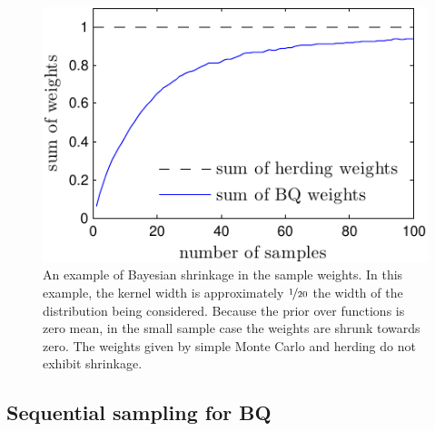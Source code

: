 \begin{figure}
	\centering
	\includegraphics[width=\columnwidth]{figs/herding/weights_shrinkage}
	
		\caption[The concept of shrinkage in Bayesian quadrature]{An example of Bayesian shrinkage in the sample weights.  In this example, the kernel width is approximately $\nicefrac{1}{20}$ the width of the distribution being considered.  Because the prior over functions is zero mean, in the small sample case the weights are shrunk towards zero.  The weights given by simple Monte Carlo and herding do not exhibit shrinkage. }
	\label{fig:weights_shrinkage}
\end{figure}



\subsection{Sequential sampling for BQ}

